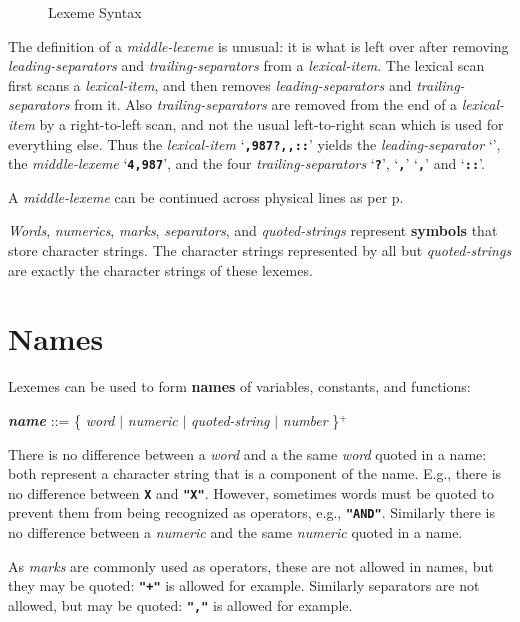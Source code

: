 \documentclass[12pt]{article}
\newcommand{\TT}[1]{{\tt \bfseries #1}}
\newcommand{\key}[1]{{\rm \bfseries #1}}
\newcommand{\emkey}[1]{{\em \bfseries #1}}
\newcommand{\pagref}[1]{p\pageref{#1}}
\newcommand{\PLUS}[1][]{{$^{+#1}$}}
\newlength{\figurewidth}
\newenvironment{boxedfigure}[1][!btp]%
	{\begin{figure*}[#1]
	 \begin{lrbox}{\figurebox}
	 \begin{minipage}{\figurewidth}

	 \vspace*{1ex}}%
	{
	 \vspace*{1ex}

	 \end{minipage}
	 \end{lrbox}
	 \begin{center}
	 \fbox{\hspace*{0.1in}\usebox{\figurebox}\hspace*{0.1in}}
	 \end{center}
	 \end{figure*}}
\newenvironment{indpar}[1][0.3in]%
	{\begin{list}{}%
		     {\setlength{\itemsep}{0in}%
		      \setlength{\topsep}{0in}%
		      \setlength{\parsep}{1ex}%
		      \setlength{\labelwidth}{#1}%
		      \setlength{\leftmargin}{#1}%
		      \addtolength{\leftmargin}{\labelsep}}%
	 \item}%
	{\end{list}}
\begin{document}
\begin{boxedfigure}[!p]
\begin{indpar}
\end{indpar}
\caption{Lexeme Syntax}
\label{LEXEME-SYNTAX}
\end{boxedfigure}

The definition of a {\em middle-lexeme} is unusual: it is what is left over
after removing {\em leading-separators} and {\em trailing-separators}
from a {\em lexical-item}.  The lexical scan first scans a
{\em lexical-item}, and then removes
{\em leading-separators} and {\em trailing-separators} from it.
Also {\em trailing-separators} are removed
from the end of a {\em lexical-item} by a right-to-left scan, and not
the usual left-to-right scan which is used for everything else.
Thus the {\em lexical-item}
`\TT{,987?,{},::}' yields the
{\em leading-separator} `\TT{\textquestiondown}',
the {\em middle-lexeme} `\TT{4,987}',
and the four {\em trailing-separators} `\TT{?}',
`\TT{,}' `\TT{,}' and `\TT{::}'.

A {\em middle-lexeme} can be continued across physical lines
as per \pagref{MIDDLE-LEXEME-CONCATENATION}.


{\em Words}, {\em numerics}, {\em marks}, {\em separators},
and {\em quoted-strings} represent 
\key{symbols}\label{SYMBOL} that store character strings.
The character strings represented by all but {\em quoted-strings}
are exactly the character strings of these lexemes.

\section{Names}
\label{NAMES}

Lexemes can be used to form \key{names} of variables,
constants, and functions:

\begin{indpar}
\emkey{name}\label{NAME} ::=
	\{ {\em word} $|$ {\em numeric} $|$ {\em quoted-string}
		      $|$ {\em number} \}\PLUS{}
\end{indpar}

There is no difference between a {\em word} and a the same {\em word}
quoted in a name: both represent a character string that is a component of
the name.  E.g., there is no difference between \TT{X} and \TT{"X"}.  However,
sometimes words must be quoted to prevent them from being recognized
as operators, e.g., \TT{"AND"}.
Similarly there is no difference between a {\em numeric} and the same
{\em numeric} quoted in a name.

As {\em marks} are commonly used as
operators, these are not allowed in names, but they may be quoted:
\TT{"+"} is allowed for example.  Similarly separators are not allowed,
but may be quoted: \TT{","} is allowed for example.
\end{document}
